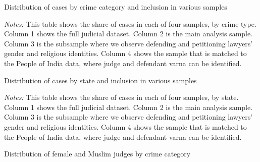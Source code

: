 \documentclass[12pt,english]{article}
\newcommand{\HOME}{\string~}
\newcommand{\curpath}{\HOME/ddl/justice-overleaf}
\newcommand{\curpath}{.}
\begin{document}
\begin{appendices}
\begin{landscape}
\end{landscape}

\newpage
\begin{table}
      \begin{center}
        \caption{Distribution of cases by crime category and inclusion in various samples}
        \label{tab:summary_crime_cat}
        \resizebox{1\linewidth}{!}{
        }
      \end{center}
        \begin{minipage}{1\textwidth}
          {\scriptsize \emph{Notes:} This table shows the share of cases in each of four samples, by crime type. Column 1 shows the full judicial dataset. Column 2 is the main analysis sample. Column 3 is the subsample where we observe defending and petitioning lawyers' gender and religious identities. Column 4 shows the sample that is matched to the People of India data, where judge and defendant varna can be identified.\par}
 \end{minipage}
\end{table}

\newpage
\begin{table}
      \begin{center}
        \caption{Distribution of cases by state and inclusion in various samples}
        \label{tab:summary_state}
        \resizebox{1\linewidth}{!}{
        }
      \end{center}
        \begin{minipage}{1\textwidth}
          {\scriptsize \emph{Notes:} This table shows the share of cases in each of four samples, by state. Column 1 shows the full judicial dataset. Column 2 is the main analysis sample. Column 3 is the subsample where we observe defending and petitioning lawyers' gender and religious identities. Column 4 shows the sample that is matched to the People of India data, where judge and defendant varna can be identified.\par}
 \end{minipage}
\end{table}

\newpage
\begin{table}[h!]
  \begin{center}
  \caption{Distribution of female and Muslim judges by crime category}
  \label{tab:judge_crime_cat}
  


\end{center}
\end{table}
\end{appendices}
\end{document}

